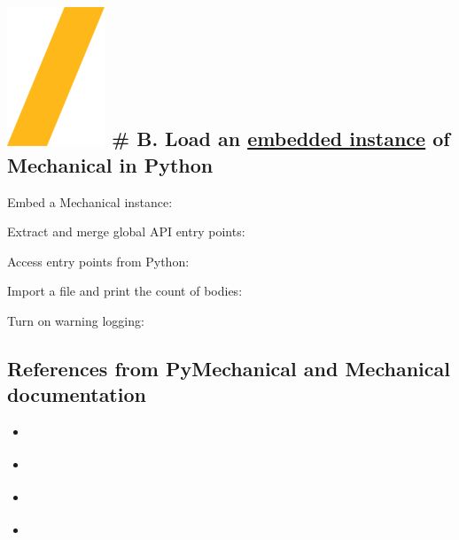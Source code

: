 \documentclass[9pt,landscape]{article}
\begin{document}
\begin{multicols}{3}

\section{\includegraphics[height=\fontcharht\font`\S]{slash.png} # B. Load an  \underline{embedded instance} of Mechanical in Python}
Embed a Mechanical instance: 

Extract and merge global API entry points:

Access entry points from Python: 

Import a file and print the count of bodies:

Turn on warning logging:


\subsection{References from PyMechanical and Mechanical documentation}
\begin{multicols}{2}
\begin{itemize}
\item \href{https://mechanical.docs.pyansys.com/version/stable/getting_started/index.html}{\color{blue}{Getting started}}
\item \href{https://mechanical.docs.pyansys.com/version/stable/examples/index.html}{\color{blue}{Examples}}
\item \href{https://mechanical.docs.pyansys.com/version/stable/api/index.html}{\color{blue}{API reference}}
\item \href{https://ansyshelp.ansys.com/account/secured?returnurl=/Views/Secured/corp/v231/en/act_script/act_script.html}{\color{blue}{Scripting in Mechanical Guide}}
\end{itemize}
\end{multicols}
\end{multicols}
\end{document}

